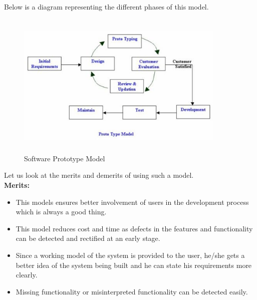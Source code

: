 \documentclass{article}
\begin{document}
Below is a diagram representing the different phases of this model.\\
\begin{figure}
  \includegraphics[width=10cm, height=7cm]{fig3.jpg}
  \caption{Software Prototype Model}
  
\end{figure}
 


\vspace{5cm}
Let us look at the merits and demerits of using such a model.\\

\textbf{Merits:}
\begin{itemize}
    


\item 	This models ensures better involvement of users in the development process which is always a good thing.
\item 	This model reduces cost and time as defects in the features and functionality can be detected and rectified at an early stage.
\item 	Since a working model of the system is provided to the user, he/she gets a better idea of the system being built and he can state his requirements more clearly.
\item Missing functionality or misinterpreted functionality can be detected easily.
\end{itemize}
\end{document}
